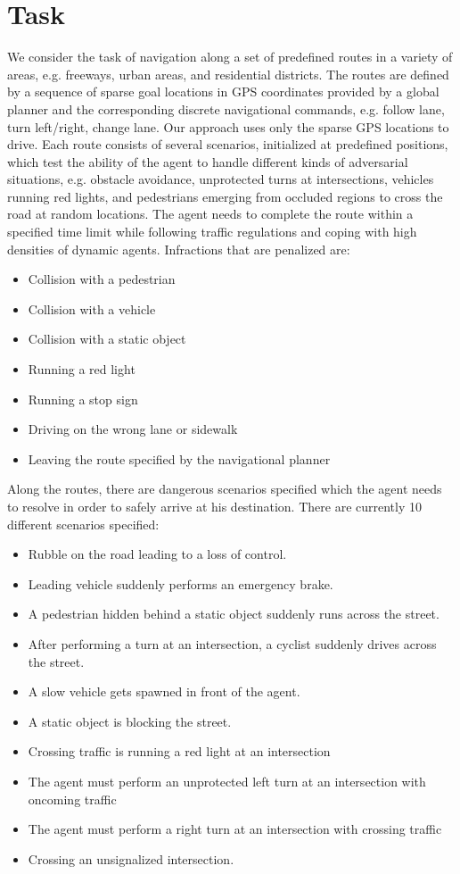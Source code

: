 \documentclass[letterpaper, 12pt]{book}
\theoremstyle{definition}
\theoremstyle{definition}
\theoremstyle{definition}
\theoremstyle{definition}
\theoremstyle{definition}
\begin{document}
\section{Task}
\label{sec:org783ac85}
We consider the task of navigation along a set of predefined routes in a variety
of areas, e.g. freeways, urban areas, and residential districts. The routes are
defined by a sequence of sparse goal locations in GPS coordinates provided by a
global planner and the corresponding discrete navigational commands, e.g. follow
lane, turn left/right, change lane. Our approach uses only the sparse GPS
locations to drive. Each route consists of several scenarios, initialized at
predefined positions, which test the ability of the agent to handle different
kinds of adversarial situations, e.g. obstacle avoidance, unprotected turns at
intersections, vehicles running red lights, and pedestrians emerging from
occluded regions to cross the road at random locations. The agent needs to
complete the route within a specified time limit while following traffic
regulations and coping with high densities of dynamic agents. Infractions that
are penalized are:
\begin{itemize}
\item Collision with a pedestrian
\item Collision with a vehicle
\item Collision with a static object
\item Running a red light
\item Running a stop sign
\item Driving on the wrong lane or sidewalk
\item Leaving the route specified by the navigational planner
\end{itemize}
Along the routes, there are dangerous scenarios specified which the agent needs to
resolve in order to safely arrive at his destination. There are currently 10 different
scenarios specified:
\begin{itemize}
\item Rubble on the road leading to a loss of control.
\item Leading vehicle suddenly performs an emergency brake.
\item A pedestrian hidden behind a static object suddenly runs across the street.
\item After performing a turn at an intersection, a cyclist suddenly drives across
the street.
\item A slow vehicle gets spawned in front of the agent.
\item A static object is blocking the street.
\item Crossing traffic is running a red light at an intersection
\item The agent must perform an unprotected left turn at an intersection with oncoming traffic
\item The agent must perform a right turn at an intersection with crossing traffic
\item Crossing an unsignalized intersection.
\end{itemize}
\end{document}
